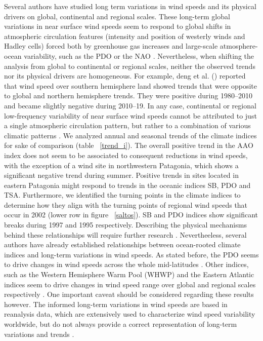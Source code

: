\documentclass[AMA,Times1COL]{WileyNJDv5} %
\begin{document}
\begin{linenumbers}
Several authors have studied long term variations in wind speeds and its physical drivers on global, continental and regional scales. These long-term global variations in near surface wind speeds seem to respond to global shifts in atmospheric circulation features (intensity and position of westerly winds and Hadley cells) forced both by greenhouse gas increases and large-scale atmosphere-ocean variability, such as the PDO or the NAO \cite{zeng2019reversal,deng2021global,zhou2021continuous}. Nevertheless, when shifting the analysis from global to continental or regional scales, neither the observed trends nor its physical drivers are homogeneous. For example, deng et al. (\cite{deng2021global}) reported that wind speed over southern hemisphere land showed trends that were opposite to global and northern hemisphere trends. They were positive during 1980–2010 and became slightly negative during 2010–19. In any case, continental or regional low-frequency variability of near surface wind speeds cannot be attributed to just a single atmospheric circulation pattern, but rather to a combination of various climatic patterns \cite{naizghi2017teleconnections, zeng2019reversal, shen2021centennial, utrabo2022wind}. We analyzed annual and seasonal trends of the climate indices for sake of comparison (table ~\ref{trend_i}). The overall positive trend in the AAO index does not seem to be associated to consequent reductions in wind speeds, with the exception of a wind site in northwestern Patagonia, which shows a significant negative trend during summer. Positive trends in sites located in eastern Patagonia might respond to trends in the oceanic indices SB, PDO and TSA. Furthermore, we identified the turning points in the climate indices to determine how they align with the turning points of regional wind speeds that occur in 2002 (lower row in figure ~\ref{saltos}). SB and PDO indices show significant breaks during 1997 and 1995 respectively. Describing the physical mechanisms behind these relationships will require further research \cite{zeng2019reversal}. Nevertheeless, several authors have already established relationships between ocean-rooted climate indices and long-term variations in wind speeds. As stated before, the PDO seems to drive changes in wind speeds across the whole mid-latitudes \cite{lledo2018investigating, zeng2019reversal}. Other indices, such as the Western Hemisphere Warm Pool (WHWP) and the Eastern Atlantic indices seem to drive changes in wind speed range over global and regional scales respectively \cite{zhou2021continuous}. One important caveat should be considered regarding these results however. The informed long-term variations in wind speeds are based in reanalysis data, which are extensively used to characterize wind speed variability worldwide, but do not always provide a correct representation of long-term variations and trends \cite{wohland2019inconsistent,merino2022wind}.


\end{linenumbers}
\end{document}
